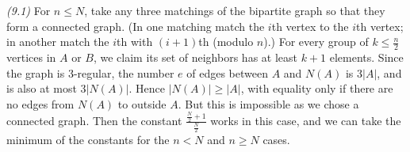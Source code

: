 \begin{problem}{\it(9.1)}
For $n\le N$, take any three matchings of the bipartite graph so that they  form a connected graph. (In one matching match the $i$th vertex to the $i$th vertex; in another match the $i$th with $(i+1)$th (modulo $n$).) For every group of $k\le \frac n2$ vertices in $A$ or $B$, we claim its set of neighbors has at least $k+1$ elements. Since the graph is 3-regular, the number $e$ of edges between $A$ and $N(A)$ is $3|A|$, and is also at most $3|N(A)|$. Hence $|N(A)|\ge |A|$, with equality only if there are no edges from $N(A)$ to outside $A$. But this is impossible as we chose a connected graph. 
Then the constant $\frac{\frac N2+1}{\frac N2}$ works in this case, and we can take the minimum of the constants for the $n<N$ and $n\ge N$ cases. 


\end{problem}

